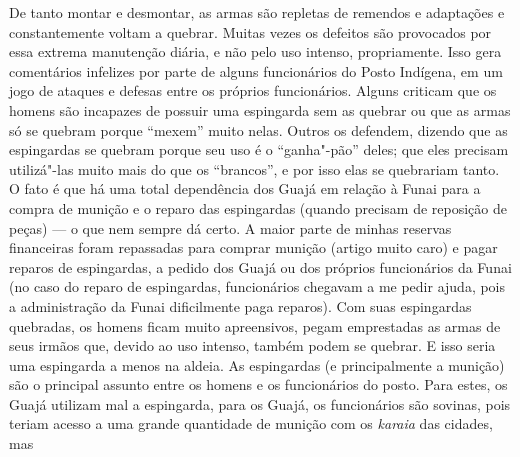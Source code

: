 De tanto montar e desmontar, as armas são repletas de remendos e
adaptações e constantemente voltam a quebrar. Muitas vezes os defeitos
são provocados por essa extrema manutenção diária, e não pelo uso
intenso, propriamente. Isso gera comentários infelizes por parte de
alguns funcionários do Posto Indígena, em um jogo de ataques e defesas
entre os próprios funcionários. Alguns criticam que os homens são
incapazes de possuir uma espingarda sem as quebrar ou que as armas só se
quebram porque ``mexem'' muito nelas. Outros os defendem, dizendo que as
espingardas se quebram porque seu uso é o ``ganha"-pão'' deles; que eles
precisam utilizá"-las muito mais do que os ``brancos'', e por isso elas se
quebrariam tanto. O fato é que há uma total dependência dos Guajá em
relação à Funai para a compra de munição e o reparo das espingardas
(quando precisam de reposição de peças) --- o que nem sempre dá certo. A
maior parte de minhas reservas financeiras foram repassadas para comprar
munição (artigo muito caro) e pagar reparos de espingardas, a pedido dos
Guajá ou dos próprios funcionários da Funai (no caso do reparo de
espingardas, funcionários chegavam a me pedir ajuda, pois a
administração da Funai dificilmente paga reparos). Com suas espingardas
quebradas, os homens ficam muito apreensivos, pegam emprestadas as armas
de seus irmãos que, devido ao uso intenso, também podem se quebrar. E
isso seria uma espingarda a menos na aldeia. As espingardas (e
principalmente a munição) são o principal assunto entre os homens e os
funcionários do posto. Para estes, os Guajá utilizam mal a espingarda,
para os Guajá, os funcionários são sovinas, pois teriam acesso a uma
grande quantidade de munição com os \emph{karaia} das cidades, mas

